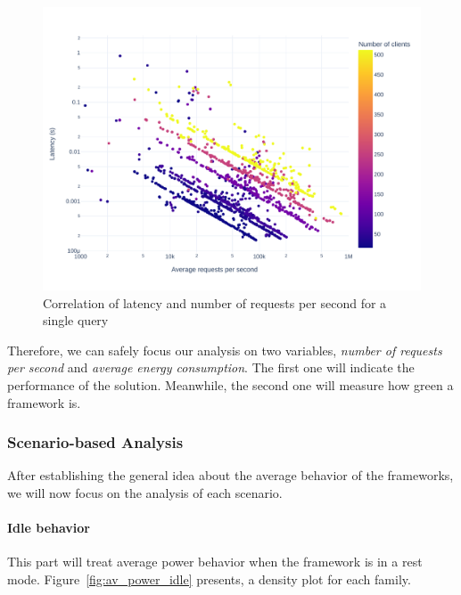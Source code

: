 \begin{figure}[!h]
    \centering
    \includegraphics[width=.9\columnwidth ]{imgs/scatter_db_latency_rps}
    \caption{Correlation of latency and number of requests per second for a single query}
    \label{fig:scatter_db}
\end{figure}

Therefore, we can safely focus our analysis on two variables, \emph{number of requests per second} and \emph{average energy consumption}. The first one will indicate the performance of the solution. Meanwhile, the second one will measure how green a framework is.






\subsubsection{Scenario-based Analysis}
After establishing the general idea about the average behavior of the frameworks, we will now focus on the analysis of each scenario.

\paragraph{Idle behavior}
This part will treat average power behavior when the framework is in a rest mode.
Figure~\ref{fig:av_power_idle} presents, a density plot for each family.

